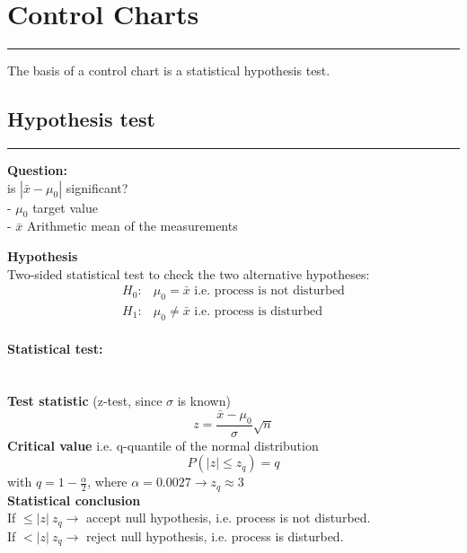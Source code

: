 \section{Control Charts}
\noindent\rule[\linienAbstand]{\linewidth}{\linienDickeDick}
The basis of a control chart is a statistical hypothesis test.

\subsection{Hypothesis test}
\noindent\rule[\linienAbstand]{\linewidth}{\linienDicke}

\textbf{Question:}\\
is $\left|\bar{x} - \mu_0\right|$ significant?\\
 - $\mu_0$ target value\\
 - $\bar{x}$ Arithmetic mean of the measurements


\textbf{Hypothesis}\\
Two-sided statistical test to check the two alternative hypotheses:
\begin{equation}
  \begin{split}
    H_0:& \mu_0 = \bar{x} \text{ i.e. process is not disturbed}\\
    H_1:& \mu_0 \neq \bar{x} \text{ i.e. process is disturbed}
  \end{split}
\end{equation}

\paragraph{Statistical test:}\mbox{}\\
\textbf{Test statistic} (z-test, since $\sigma$ is known)
\begin{equation}
  z = \frac{\bar{x}-\mu_0}{\sigma}\sqrt{n}
\end{equation}
\textbf{Critical value} i.e. q-quantile of the normal distribution
\begin{equation}
  P(|z| \leq z_q) = q
\end{equation}
with $q = 1- \frac{\alpha}{2}$, where $\alpha = 0.0027 \rightarrow z_q \approx 3$\\

\textbf{Statistical conclusion}\\
If $\leq |z| \ z_q \rightarrow$ accept null hypothesis, i.e. process is not disturbed.\\
If $< |z| \ z_q \rightarrow$ reject null hypothesis, i.e. process is disturbed.\\

